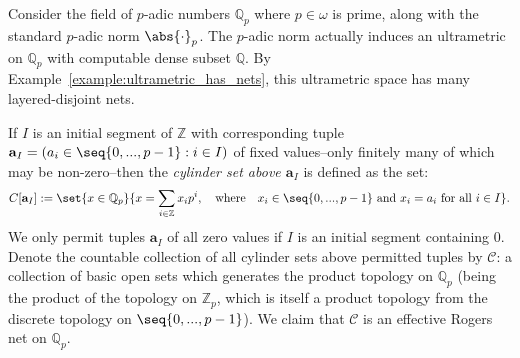 \begin{example}
    Consider the field of $p$-adic numbers $\mathbb{Q}_p$ where $p \in \omega$ is prime, along with the standard $p$-adic norm $\abs{\cdot}_p$. The $p$-adic norm actually induces an ultrametric on $\mathbb{Q}_p$ with computable dense subset $\mathbb{Q}$. By Example~\ref{example:ultrametric_has_nets}, this ultrametric space has many layered-disjoint nets. 
    
    If $I$ is an initial segment of $\mathbb{Z}$ with corresponding tuple $\mathbf{a}_I = (a_i \in \seq{0, ..., p - 1} : i \in I)$ of fixed values--only finitely many of which may be non-zero--then the \textit{cylinder set above $\mathbf{a}_I$} is defined as the set:
    \begin{align*}
        C[\mathbf{a}_I] := \set{x \in \mathbb{Q}_p}{x = \sum_{i \in \mathbb{Z}} x_i p^i, \quad \text{where} \quad x_i \in \seq{0, ..., p - 1}  \text{ and } x_i = a_i \text{ for all } i \in I}.
    \end{align*}    
    We only permit tuples $\mathbf{a}_I$ of all zero values if $I$ is an initial segment containing $0$. Denote the countable collection of all cylinder sets above permitted tuples by $\mathcal{C}$: a collection of basic open sets which generates the product topology on $\mathbb{Q}_p$ (being the product of the topology on $\mathbb{Z}_p$, which is itself a product topology from the discrete topology on $\seq{0, ..., p - 1}$). We claim that $\mathcal{C}$ is an effective Rogers net on $\mathbb{Q}_p$.
    

\end{example}
